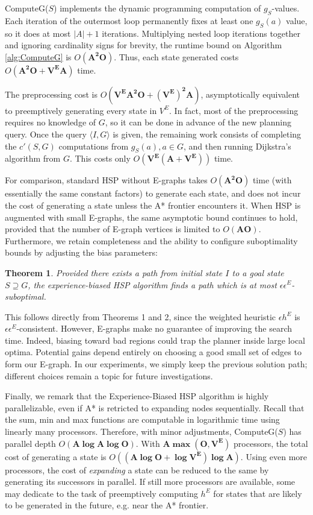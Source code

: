 \documentclass[letterpaper]{article}
\newtheorem{thm}{Theorem}
\begin{document}
ComputeG($S$) implements the dynamic programming computation of $g_S$-values.
Each iteration of the outermost loop permanently fixes at least one $g_S(a)$ value, so it does at most $|A|+1$ iterations.
Multiplying nested loop iterations together and ignoring cardinality signs for brevity, the runtime bound on Algorithm \ref{alg:ComputeG} is $O(\mathbf{A^2O})$.
Thus, each state generated costs $O(\mathbf{A^2O + V^EA})$ time.

The preprocessing cost is $O(\mathbf{V^EA^2O + (V^E)^2A})$, asymptotically equivalent to preemptively generating every state in $V^E$.
In fact, most of the preprocessing requires no knowledge of $G$, so it can be done in advance of the new planning query. Once the query $\langle I,G\rangle$ is given, the remaining work consists of completing the $c'(S,G)$ computations from $g_S(a),a\in G$, and then running Dijkstra's algorithm from $G$. This costs only $O(\mathbf{V^E(A + V^E)})$ time.

For comparison, standard HSP without E-graphs takes $O(\mathbf{A^2O})$ time (with essentially the same constant factors) to generate each state, and does not incur the cost of generating a state unless the A* frontier encounters it.
When HSP is augmented with small E-graphs, the same asymptotic bound continues to hold, provided that the number of E-graph vertices is limited to $O(\mathbf{AO})$. Furthermore, we retain completeness and the ability to configure suboptimality bounds by adjusting the bias parameters:

\begin{thm}
Provided there exists a path from initial state $I$ to a goal state $S\supseteq G$, the experience-biased HSP algorithm finds a path which is at most $\epsilon\epsilon^E$-suboptimal.
\end{thm}

This follows directly from Theorems 1 and 2, since the weighted heuristic $\epsilon h^E$ is $\epsilon \epsilon^E$-consistent.
However, E-graphs make no guarantee of improving the search time. Indeed, biasing toward bad regions could trap the planner inside large local optima.
Potential gains depend entirely on choosing a good small set of edges to form our E-graph.
In our experiments, we simply keep the previous solution path; different choices remain a topic for future investigations.

Finally, we remark that the Experience-Biased HSP algorithm is highly parallelizable, even if A* is retricted to expanding nodes sequentially. Recall that the sum, min and max functions are computable in logarithmic time using linearly many processors. Therefore, with minor adjustments, ComputeG($S$) has parallel depth $O(\mathbf{A\log A\log O})$. With $\mathbf{A\max(O,V^E)}$ processors, the total cost of generating a state is $O(\mathbf{(A\log O + \log V^E)\log A})$. Using even more processors, the cost of \textit{expanding} a state can be reduced to the same by generating its successors in parallel. If still more processors are available, some may dedicate to the task of preemptively computing $h^E$ for states that are likely to be generated in the future, e.g. near the A* frontier.
\end{document}
